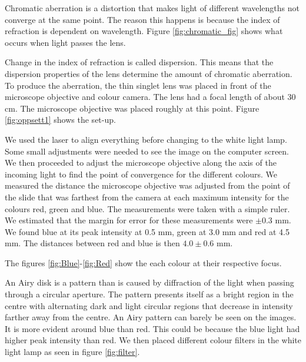 Chromatic aberration is a distortion that makes light of different wavelengths not converge at the same point. The reason this happens is because the index of refraction is dependent on wavelength. Figure \vref{fig:chromatic_fig} shows what occurs when light passes the lens.


 Change in the index of refraction is called dispersion. This means that the dispersion properties of the lens determine the amount of chromatic aberration. To produce the aberration, the thin singlet lens was placed in front of the microscope objective and colour camera. The lens had a focal length of about 30 cm. The microscope objective was placed roughly at this point. Figure \vref{fig:oppsett1} shows the set-up. 


We used the laser to align everything before changing to the white light lamp. Some small adjustments were needed to see the image on the computer screen. We then proceeded to adjust the microscope objective along the axis of the incoming light to find the point of convergence for the different colours. We measured the distance the microscope objective was adjusted from the point of the slide that was farthest from the camera at each maximum intensity for the colours red, green and blue. The measurements were taken with a simple ruler. We estimated that the margin for error for these measurements were $\pm 0.3$ mm. We found blue at its peak intensity at 0.5 mm, green at 3.0 mm and red at 4.5 mm. The distances between red and blue is then $4.0 \pm 0.6$ mm.


The figures \vref{fig:Blue}-\vref{fig:Red} show the each colour at their respective focus.

An Airy disk is a pattern than is caused by diffraction of the light when passing through a circular aperture. The pattern presents itself as a bright region in the centre with alternating dark and light circular regions that decrease in intensity farther away from the centre. An Airy pattern can barely be seen on the images. It is more evident around blue than red. This could be because the blue light had higher peak intensity than red. We then placed different colour filters in the white light lamp as seen in figure \vref{fig:filter}.

